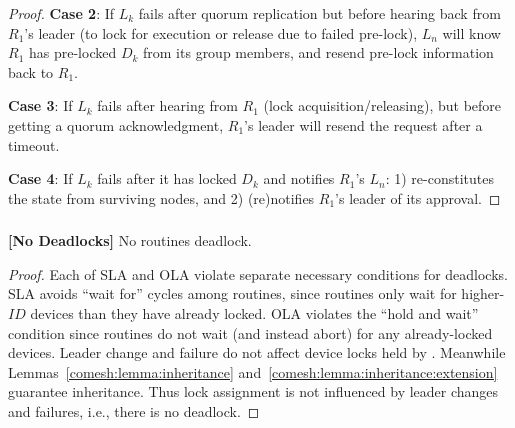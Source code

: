 \begin{proof}
{
\label{comesh:theorem:safety:ola:case2}
\noindent \textbf{Case 2}: If $L_k$ fails after quorum replication 
but before hearing back from $R_1$'s leader (to  lock for execution or release due to failed pre-lock),
$L_n$ will know $R_1$ has pre-locked $D_k$ from its group members, and resend pre-lock information back to $R_1$.


\label{comesh:theorem:safety:ola:case3}
\noindent \textbf{Case 3}: If $L_k$ fails after hearing from $R_1$ (lock acquisition/releasing), but before getting a quorum acknowledgment, $R_1$'s \kgroup{} leader will resend the request after a timeout.


\label{comesh:theorem:safety:ola:case4}
\noindent \textbf{Case 4}: If $L_k$ fails after it has locked $D_k$ and notifies $R_1$'s \kgroup{}
$L_n$: 1) re-constitutes the state from surviving nodes,
and 2) (re)notifies $R_1$'s \kgroup{} leader of its approval.
}
\end{proof}

\subsubsection{\Liveness{}}
\label{comesh:subsec:liveness}

\begin{theorem}
\label{comesh:theorem:deadlock} {\bf [No Deadlocks]} 
No routines deadlock.
\end{theorem}

\begin{proof}
\label{comesh:theorem:deadlock:proof:sla}
Each of SLA and OLA violate separate necessary conditions for deadlocks. 
SLA avoids ``wait for'' cycles among routines, since routines only wait for higher-$ID$ devices than they have already locked.
\label{comesh:theorem:deadlock:proof:ola}
{
OLA violates the ``hold and wait'' condition since routines do not wait (and instead abort) for any already-locked devices. 
}
%
Leader change and failure do not affect device locks held by \sysname.
Meanwhile Lemmas~\ref{comesh:lemma:inheritance} and~\ref{comesh:lemma:inheritance:extension} guarantee inheritance.
Thus lock assignment is not influenced by leader changes and failures, i.e., there is no deadlock.
\end{proof}

